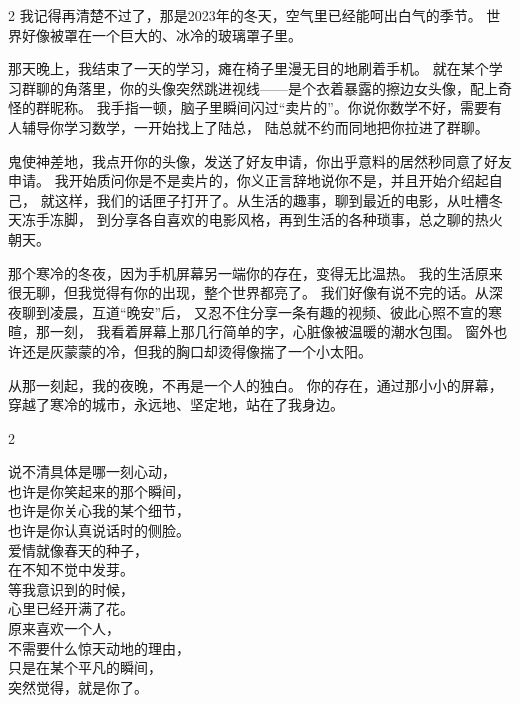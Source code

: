 \large
\begin{spacing}{2}
    我记得再清楚不过了，那是2023年的冬天，空气里已经能呵出白气的季节。
    世界好像被罩在一个巨大的、冰冷的玻璃罩子里。

    那天晚上，我结束了一天的学习，瘫在椅子里漫无目的地刷着手机。
    就在某个学习群聊的角落里，你的头像突然跳进视线——是个衣着暴露的擦边女头像，配上奇怪的群昵称。
    我手指一顿，脑子里瞬间闪过“卖片的”。你说你数学不好，需要有人辅导你学习数学，一开始找上了陆总，
    陆总就不约而同地把你拉进了群聊。

    鬼使神差地，我点开你的头像，发送了好友申请，你出乎意料的居然秒同意了好友申请。
    我开始质问你是不是卖片的，你义正言辞地说你不是，并且开始介绍起自己，
    就这样，我们的话匣子打开了。从生活的趣事，聊到最近的电影，从吐槽冬天冻手冻脚，
    到分享各自喜欢的电影风格，再到生活的各种琐事，总之聊的热火朝天。

    那个寒冷的冬夜，因为手机屏幕另一端你的存在，变得无比温热。
    我的生活原来很无聊，但我觉得有你的出现，整个世界都亮了。
    我们好像有说不完的话。从深夜聊到凌晨，互道“晚安”后，
    又忍不住分享一条有趣的视频、彼此心照不宣的寒暄，那一刻，
    我看着屏幕上那几行简单的字，心脏像被温暖的潮水包围。
    窗外也许还是灰蒙蒙的冷，但我的胸口却烫得像揣了一个小太阳。

    从那一刻起，我的夜晚，不再是一个人的独白。 
    你的存在，通过那小小的屏幕，穿越了寒冷的城市，永远地、坚定地，站在了我身边。  
    
\end{spacing}

\clearpage

\subtitle{心动的瞬间}

\vspace*{1cm}

\large
\begin{spacing}{2}
    \begin{center}
        说不清具体是哪一刻心动，\\
        也许是你笑起来的那个瞬间，\\
        也许是你关心我的某个细节，\\
        也许是你认真说话时的侧脸。\\[0.3cm]
        
        爱情就像春天的种子，\\
        在不知不觉中发芽。\\
        等我意识到的时候，\\
        心里已经开满了花。\\[0.3cm]
        
        原来喜欢一个人，\\
        不需要什么惊天动地的理由，\\
        只是在某个平凡的瞬间，\\
        突然觉得，就是你了。
    \end{center}
    
\end{spacing}

\clearpage